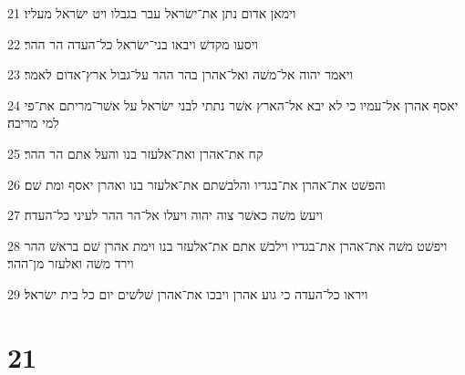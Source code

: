 \par 21 וימאן אדום נתן את־ישׂראל עבר בגבלו ויט ישׂראל מעליו׃
\par 22 ויסעו מקדשׁ ויבאו בני־ישׂראל כל־העדה הר ההר׃
\par 23 ויאמר יהוה אל־משׁה ואל־אהרן בהר ההר על־גבול ארץ־אדום לאמר׃
\par 24 יאסף אהרן אל־עמיו כי לא יבא אל־הארץ אשׁר נתתי לבני ישׂראל על אשׁר־מריתם את־פי למי מריבה׃
\par 25 קח את־אהרן ואת־אלעזר בנו והעל אתם הר ההר׃
\par 26 והפשׁט את־אהרן את־בגדיו והלבשׁתם את־אלעזר בנו ואהרן יאסף ומת שׁם׃
\par 27 ויעשׂ משׁה כאשׁר צוה יהוה ויעלו אל־הר ההר לעיני כל־העדה׃
\par 28 ויפשׁט משׁה את־אהרן את־בגדיו וילבשׁ אתם את־אלעזר בנו וימת אהרן שׁם בראשׁ ההר וירד משׁה ואלעזר מן־ההר׃
\par 29 ויראו כל־העדה כי גוע אהרן ויבכו את־אהרן שׁלשׁים יום כל בית ישׂראל׃

\chapter{21}

